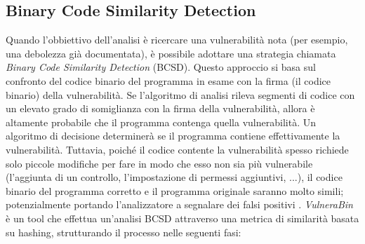 \documentclass[../main.tex]{subfiles}
\begin{document}
\subsection{Binary Code Similarity Detection}
Quando l'obbiettivo dell'analisi è ricercare una vulnerabilità nota (per esempio, una debolezza già documentata), è possibile adottare una strategia chiamata \textit{Binary Code Similarity Detection} (BCSD).
Questo approccio si basa sul confronto del codice binario del programma in esame con la firma (il codice binario) della vulnerabilità.
Se l'algoritmo di analisi rileva segmenti di codice con un elevato grado di somiglianza con la firma della vulnerabilità, allora è altamente probabile che il programma
contenga quella vulnerabilità. Un algoritmo di decisione determinerà se il programma contiene effettivamente la vulnerabilità.
Tuttavia, poiché il codice contente la vulnerabilità spesso richiede solo piccole modifiche per fare in modo che esso non sia più vulnerabile (l'aggiunta di un controllo, l'impostazione di permessi aggiuntivi, ...), il codice binario del programma corretto e il programma originale
saranno molto simili; potenzialmente portando l'analizzatore a segnalare dei falsi positivi \cite{Survey_of_Binary_Code_Security_Analysis}. \newline
\textit{VulneraBin} \cite{VulneraBin} è un tool che effettua un'analisi BCSD attraverso una metrica di similarità basata su hashing, strutturando il processo nelle seguenti fasi:
\end{document}

